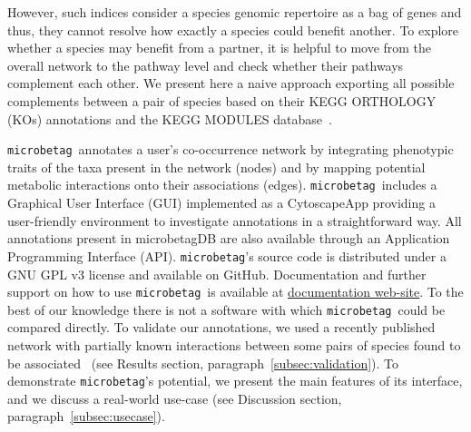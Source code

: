 \documentclass[sn-mathphys,Numbered]{sn-jnl}  %
\theoremstyle{thmstyleone}%
\theoremstyle{thmstyletwo}%
\theoremstyle{thmstylethree}%
\newcommand{\microbetag}{\texttt{microbetag}}
\begin{document}
    However, such indices consider a species genomic repertoire as a bag of genes and thus, they cannot resolve how exactly a species could benefit another.
    To explore whether a species may benefit from a partner, it is helpful to move from the overall network to the pathway level and check whether their pathways complement each other.
    We present here a naive approach exporting all possible complements between a pair of species based on their KEGG ORTHOLOGY (KOs) annotations and the KEGG MODULES database~\cite{keggmodulesdb}.

    \microbetag~annotates a user's co-occurrence network by integrating phenotypic traits of the taxa present in the network (nodes) and by mapping potential metabolic interactions onto their associations (edges).
    \microbetag~includes a Graphical User Interface (GUI) implemented as a CytoscapeApp providing a user-friendly environment to investigate annotations in a straightforward way.
    All annotations present in microbetagDB are also available through an Application Programming Interface (API).
    \microbetag's source code is distributed under a GNU GPL v3 license and available on GitHub. 
    Documentation and further support on how to use \microbetag~is available at \href{https://hariszaf.github.io/microbetag/}{documentation web-site}.
    To the best of our knowledge there is not a software with which \microbetag~could be compared directly.
    To validate our annotations, we used a recently published network with partially known interactions between some pairs of species found to be associated~\cite{hessler2023vitamin} (see Results section, paragraph~\ref{subsec:validation}).
    To demonstrate \microbetag's potential, we present the main features of its interface, and we discuss a real-world use-case (see Discussion section, paragraph~\ref{subsec:usecase}).



\end{document}
